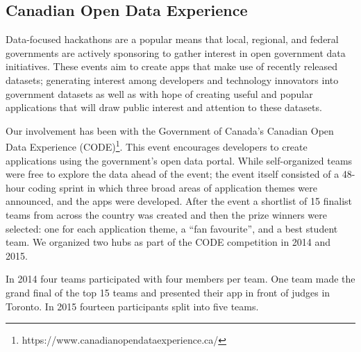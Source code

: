 \subsection{Canadian Open Data Experience}

Data-focused hackathons are a popular means that local, regional, and federal governments are actively sponsoring to gather interest in open government data initiatives.  These events aim to create apps that make use of recently released datasets; generating interest among developers and technology innovators into government datasets as well as with hope of creating useful and popular applications that will draw public interest and attention to these datasets.

Our involvement has been with the Government of Canada's Canadian Open Data Experience (CODE)\footnote{https://www.canadianopendataexperience.ca/}.  This event encourages developers to create applications using the government's open data portal.  While self-organized teams were free to explore the data ahead of the event; the event itself consisted of a 48-hour coding sprint in which three broad areas of application themes were announced, and the apps were developed.  After the event a shortlist of 15 finalist teams from across the country was created and then the prize winners were selected: one for each application theme, a ``fan favourite'', and a best student team.  We organized two hubs as part of the CODE competition in 2014 and 2015.


In 2014 four teams participated with four members per team.  One team made the grand final of the top 15 teams and presented their app in front of judges in Toronto.  In 2015 fourteen participants split into five teams.  

